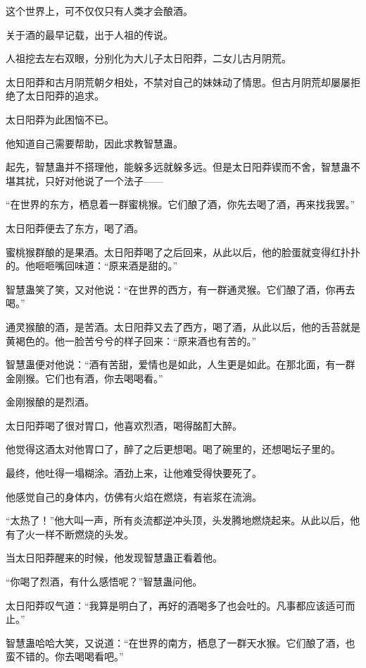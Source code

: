 
\begin{this_body}

这个世界上，可不仅仅只有人类才会酿酒。

关于酒的最早记载，出于人祖的传说。

人祖挖去左右双眼，分别化为大儿子太日阳莽，二女儿古月阴荒。

太日阳莽和古月阴荒朝夕相处，不禁对自己的妹妹动了情思。但古月阴荒却屡屡拒绝了太日阳莽的追求。

太日阳莽为此困恼不已。

他知道自己需要帮助，因此求教智慧蛊。

起先，智慧蛊并不搭理他，能躲多远就躲多远。但是太日阳莽锲而不舍，智慧蛊不堪其扰，只好对他说了一个法子——

“在世界的东方，栖息着一群蜜桃猴。它们酿了酒，你先去喝了酒，再来找我罢。”

太日阳莽便去了东方，喝了酒。

蜜桃猴群酿的是果酒。太日阳莽喝了之后回来，从此以后，他的脸蛋就变得红扑扑的。他咂咂嘴回味道：“原来酒是甜的。”

智慧蛊笑了笑，又对他说：“在世界的西方，有一群通灵猴。它们酿了酒，你再去喝。”

通灵猴酿的酒，是苦酒。太日阳莽又去了西方，喝了酒，从此以后，他的舌苔就是黄褐色的。他一脸苦兮兮的样子回来：“原来酒也有苦的。”

智慧蛊便对他说：“酒有苦甜，爱情也是如此，人生更是如此。在那北面，有一群金刚猴。它们也有酒，你去喝喝看。”

金刚猴酿的是烈酒。

太日阳莽喝了很对胃口，他喜欢烈酒，喝得酩酊大醉。

他觉得这酒太对他胃口了，醉了之后更想喝。喝了碗里的，还想喝坛子里的。

最终，他吐得一塌糊涂。酒劲上来，让他难受得快要死了。

他感觉自己的身体内，仿佛有火焰在燃烧，有岩浆在流淌。

“太热了！”他大叫一声，所有炎流都逆冲头顶，头发腾地燃烧起来。从此以后，他有了火一样不断燃烧的头发。

当太日阳莽醒来的时候，他发现智慧蛊正看着他。

“你喝了烈酒，有什么感悟呢？”智慧蛊问他。

太日阳莽叹气道：“我算是明白了，再好的酒喝多了也会吐的。凡事都应该适可而止。”

智慧蛊哈哈大笑，又说道：“在世界的南方，栖息了一群天水猴。它们酿了酒，也蛮不错的。你去喝喝看吧。”


\end{this_body}
